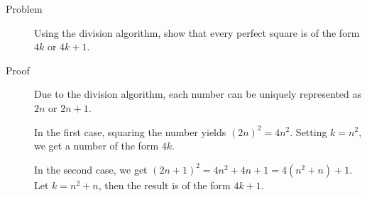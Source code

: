 \begin{description}
\item[Problem] Using the division algorithm, show that every perfect square is
of the form $4k$ or $4k+1$.

\item[Proof] Due to the division algorithm, each number can be uniquely
represented as $2n$ or $2n + 1$.

In the first case, squaring the number yields $(2n)^2 = 4n^2$. Setting $k =
n^2$, we get a number of the form $4k$.

In the second case, we get $(2n+1)^2 = 4n^2 + 4n + 1 = 4(n^2 + n) + 1$. Let
$k = n^2 + n$, then the result is of the form $4k + 1$.

\end{description}
